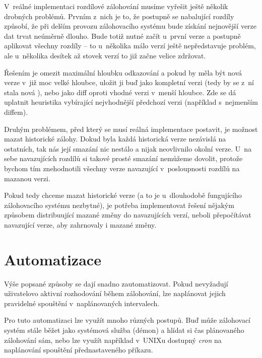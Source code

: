 V~reálné implementaci rozdílové zálohování musíme vyřešit ještě několik drobných
problémů. Prvním z~nich je to, že postupně se nabalující rozdíly způsobí, že
při delším provozu zálohovacího systému bude získání nejnovější verze dat trvat
neúměrně dlouho. Bude totiž nutné začít u~první verze a postupně aplikovat
všechny rozdíly -- to u~několika málo verzí ještě nepředstavuje problém, ale
u~několika desítek až stovek verzí to již začne velice zdržovat.

Řešením je omezit maximální hloubku odkazování a pokud by měla být nová verze
v~již moc velké hloubce, uložit ji buď jako kompletní verzi (tedy by se z~ní
stala nová ), nebo jako diff oproti vhodné verzi v~menší
hloubce. Zde se dá uplatnit heuristika vybírající nejvhodnější předchozí verzi
(například s~nejmenším diffem).

Druhým problémem, před který se musí reálná implementace postavit, je možnost
mazat historické zálohy. Dokud byla každá historická verze nezávislá na
ostatních, tak nás její smazání nic nestálo a nijak neovlivnilo okolní verze.
U~na sebe navazujících rozdílů si takové prosté smazání nemůžeme dovolit,
protože bychom tím znehodnotili všechny verze navazující v~posloupnosti rozdílů
na mazanou verzi.

Pokud tedy chceme mazat historické verze (a to je u~dlouhodobě fungujícího
zálohovacího systému nezbytné), je potřeba implementovat řešení nějakým
způsobem distribuující mazané změny do navazujících verzí, neboli přepočítávat
navazující verze, aby zahrnovaly i mazané změny.

\section{Automatizace}

Výše popsané způsoby se dají snadno zautomatizovat. Pokud nevyžadují uživatelovo
aktivní rozhodování během zálohování, lze naplánovat jejich pravidelné spouštění
v~naplánovaných intervalech.

Pro tuto automatizaci lze využít mnoho různých postupů. Buď může zálohovací
systém stále běžet jako systémová služba (démon) a hlídat si čas plánovaného
zálohování sám, nebo lze využít například v~\gls{UNIX}u dostupný {\it cron} na
naplánování spouštění přednastaveného příkazu.

%
